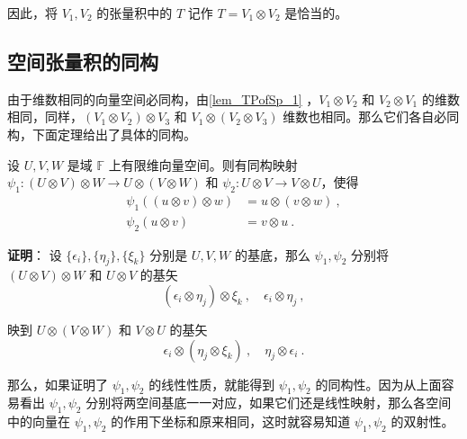  因此，将 $V_1,V_2$ 的张量积中的 $T$ 记作 $T=V_1\otimes V_2$ 是恰当的。



\subsection{空间张量积的同构}
由于维数相同的向量空间必同构，由\autoref{lem_TPofSp_1} ，$V_1\otimes V_2$ 和 $V_2\otimes V_1$ 的维数相同，同样，$(V_1\otimes V_2)\otimes V_3$ 和 $V_1\otimes( V_2\otimes V_3)$ 维数也相同。那么它们各自必同构，下面定理给出了具体的同构。
\begin{theorem}{}\label{the_TPofSp_2}
设 $U,V,W$ 是域 $\mathbb F$ 上有限维向量空间。则有同构映射 $\psi_1:(U\otimes V)\otimes W\rightarrow U\otimes(V\otimes W)$ 和 $\psi_2:U\otimes V\rightarrow V\otimes U$，使得
\begin{equation}
\begin{aligned}
\psi_1((u\otimes v)\otimes w)&=u\otimes(v\otimes w)~,\\
\psi_2(u\otimes v)&=v\otimes u~.
\end{aligned}
\end{equation}
\end{theorem}
\textbf{证明}： 设 $\{\epsilon_i\},\{\eta_j\},\{\xi_k\}$ 分别是 $U,V,W$ 的基底，那么 $\psi_1,\psi_2$ 分别将 $(U\otimes V)\otimes W$ 和 $U\otimes V$ 的基矢
\begin{equation}
(\epsilon_i\otimes\eta_j)\otimes\xi_k~,\quad \epsilon_i\otimes\eta_j~,
\end{equation}

映到 $U\otimes (V\otimes W)$ 和 $V\otimes U$ 的基矢 
\begin{equation}
\epsilon_i\otimes(\eta_j\otimes\xi_k)~,\quad \eta_j\otimes\epsilon_i~.
\end{equation}

那么，如果证明了 $\psi_1,\psi_2$ 的线性性质，就能得到 $\psi_1,\psi_2$ 的同构性。因为从上面容易看出 $\psi_1,\psi_2$ 分别将两空间基底一一对应，如果它们还是线性映射，那么各空间中的向量在 $\psi_1,\psi_2$ 的作用下坐标和原来相同，这时就容易知道 $\psi_1,\psi_2$ 的双射性。


